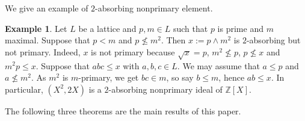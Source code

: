 \documentclass{amsart}
\theoremstyle{plain}
\theoremstyle{definition}
\newtheorem{example}[theorem]{Example}
\theoremstyle{remark}
\begin{document}
We give an example of $2$-absorbing nonprimary element.

\begin{example}\label{e1}
Let $L$ be a lattice and  $p,m\in L$ such that $p$ is  prime and $m$ maximal. Suppose that $p<m$ and $p\not\leq m^2$. Then $x:=p\wedge m^2$ is 
$2$-absorbing but not primary.
Indeed, $x$ is not primary because
$\sqrt{x}=p$, $m^2\not\leq p$, $p\not\leq x$  and $m^2p\leq x$. Suppose that $abc\leq x$ with $a,b,c\in L$. We may assume that $a\leq p$ and 
$a\not\leq m^2$. As $m^2$ is $m$-primary, we get $bc\in m$, so say $b\leq m$, hence $ab\leq x$.
In particular, $(X^2,2X)$ is a $2$-absorbing nonprimary ideal of 
$\mathbb{Z}[X]$.
\end{example}




The following three theorems are the main results of this paper.
\end{document}
